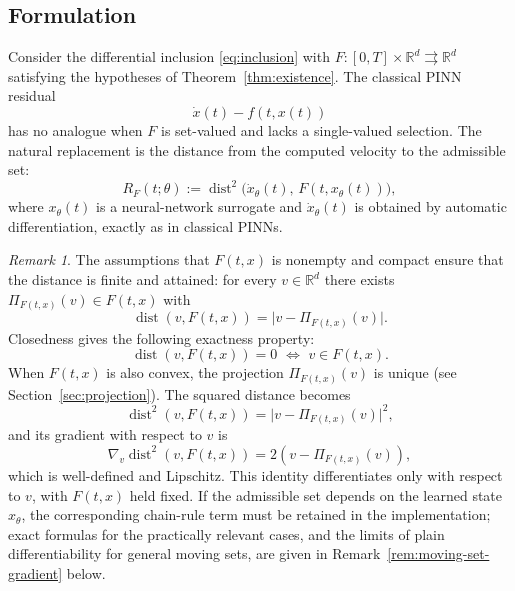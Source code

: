 \documentclass[11pt]{elsarticle}
\theoremstyle{definition}
\theoremstyle{remark}
\newtheorem{remark}[theorem]{Remark}
\numberwithin{equation}{section}
\def\dist{\operatorname{dist}}
\begin{document}
	\subsection{Formulation}
	\label{sec:description-formulation}
	
	Consider the differential inclusion \eqref{eq:inclusion} with $F:[0,T]\times\mathbb{R}^d\rightrightarrows\mathbb{R}^d$ satisfying
	the hypotheses of Theorem~\ref{thm:existence}.  The classical PINN
	residual
	\[
	\dot{x}(t)-f(t,x(t))
	\]
	has no analogue when $F$ is set-valued and lacks a single-valued
	selection.  The natural replacement is the distance from the computed
	velocity to the admissible set:
	\begin{equation}\label{eq:inclusion-residual}
		R_F(t;\theta)
		:=
		\dist^2\bigl(\dot{x}_\theta(t),\,F(t,x_\theta(t))\bigr),
	\end{equation}
	where $x_\theta(t)$ is a neural-network surrogate and $\dot{x}_\theta(t)$
	is obtained by automatic differentiation, exactly as in classical PINNs.
	
	\begin{remark}
		The assumptions that $F(t,x)$ is nonempty and compact ensure that the
		distance is finite and attained: for every $v\in\mathbb{R}^d$ there
		exists $\Pi_{F(t,x)}(v)\in F(t,x)$ with
		\[
		\dist(v,F(t,x))=\bigl|v-\Pi_{F(t,x)}(v)\bigr|.
		\]
		Closedness gives the following exactness property:
		\[
		\dist(v,F(t,x))=0 \,\,\iff\,\, v\in F(t,x).
		\]
		When $F(t,x)$ is also convex,
		the projection $\Pi_{F(t,x)}(v)$ is unique (see Section~\ref{sec:projection}).
		The squared distance becomes
		\begin{equation}\label{loss:distance}
			\dist^2(v,F(t,x))=\bigl|v-\Pi_{F(t,x)}(v)\bigr|^2,
		\end{equation}
		and its gradient with respect to $v$ is
		\[
		\nabla_v\dist^2(v,F(t,x))=2(v-\Pi_{F(t,x)}(v)),
		\]
		which is well-defined and Lipschitz. This identity differentiates
		only with respect to $v$, with $F(t,x)$ held fixed. If the admissible
		set depends on the learned state $x_\theta$, the corresponding
		chain-rule term must be retained in the implementation; exact
		formulas for the practically relevant cases, and the limits of plain
		differentiability for general moving sets, are given in
		Remark~\ref{rem:moving-set-gradient} below.
	\end{remark}
	
\end{document}
